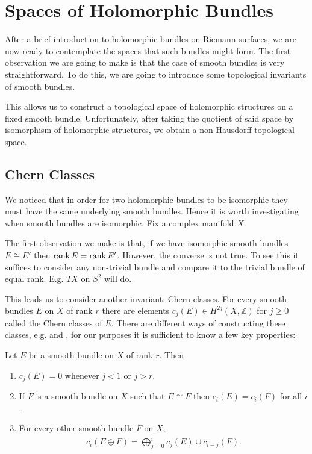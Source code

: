 \documentclass[12pt]{ociamthesis}  %
\begin{document}
\section{Spaces of Holomorphic Bundles}

After a brief introduction to holomorphic bundles on Riemann surfaces,
we are now ready to contemplate the spaces that such bundles might
form. The first observation we are going to make is that the case of
smooth bundles is very straightforward. To do this, we are going to
introduce some topological invariants of smooth bundles.

This allows us to construct a topological space of holomorphic structures
on a fixed smooth bundle. Unfortunately, after taking the quotient
of said space by isomorphism of holomorphic structures, we obtain a
non-Hausdorff topological space.

\subsection{Chern Classes}

We noticed that in order for two holomorphic bundles to be isomorphic
they must have the same underlying smooth bundles. Hence it is worth
investigating when smooth bundles are isomorphic. Fix a complex
manifold $X$.

The first observation we make is that, if we have isomorphic smooth
bundles $E\cong E'$ then $\operatorname{rank} E = \operatorname{rank} E'$. However, the converse
is not true. To see this it suffices to consider any non-trivial
bundle and compare it to the trivial bundle of equal rank. E.g.
$TX$ on $S^2$ will do.

This leads us to consider another invariant: Chern classes. For
every smooth bundles $E$ on $X$ of rank $r$ there are elements
$c_j(E)\in H^{2j}(X,\mathbb{Z})$ for $j\geq 0$ called the Chern
classes of $E$. There are different ways of constructing these classes,
e.g. \cite{fine2013} and \cite{griffiths1994}, for our purposes
it is sufficient to know a few key properties:

\begin{lemma}\missingcitation
  Let $E$ be a smooth bundle on $X$ of rank $r$. Then
  \begin{enumerate}
    \item $c_j(E) = 0$ whenever $j<1$ or $j>r$.
    \item If $F$ is a smooth bundle on $X$ such that $E\cong F$
          then $c_i(E) = c_i(F)$ for all $i$.
    \item For every other smooth bundle $F$ on $X$,
          \begin{align*}
            c_i(E\oplus F) = \bigoplus_{j=0}^{i} c_j(E)\cup c_{i-j}(F).
          \end{align*}
  \end{enumerate}
\end{lemma}
\end{document}
